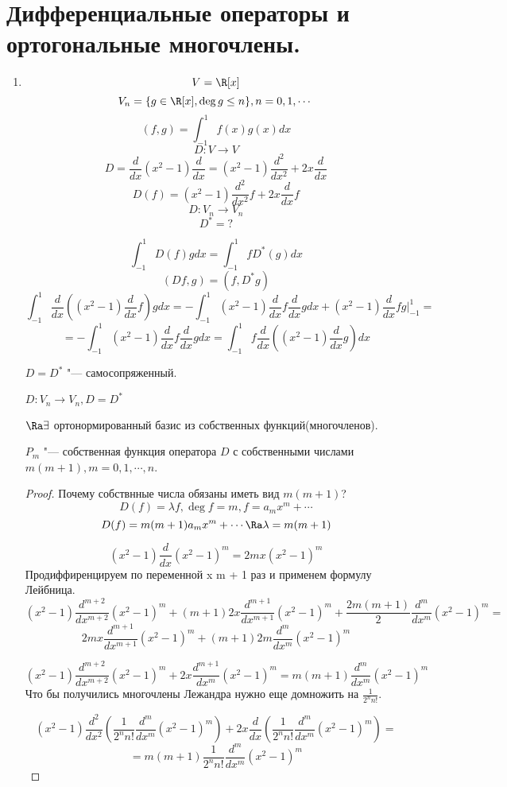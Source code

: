 ﻿\section{Дифференциальные операторы и ортогональные многочлены.}
\begin{enumerate}
\item
$$V = \R[x]$$
$$V_n = \{g \in \R[x], \deg g \le n\}, n = 0, 1, \cdots$$
$$(f, g) = \int_{-1}^{1}f(x)g(x)dx$$
$$D \colon V \to V$$
$$D = \frac{d}{dx}(x^2 - 1)\frac{d}{dx} = (x^2 - 1)\frac{d^2}{dx^2} + 2x\frac{d}{dx}$$
$$D(f) = (x^2 - 1)\frac{d^2}{dx^2}f + 2x\frac{d}{dx}f$$
$$D \colon V_n \to V_n$$
$$D^* = ?$$

$$\int_{-1}^{1}D(f)gdx = \int_{-1}^{1}fD^*(g)dx$$
$$(Df, g) = (f, D^*g)$$
$$\int_{-1}^{1}\frac{d}{dx}((x^2 - 1)\frac{d}{dx}f)gdx = -\int_{-1}^{1}(x^2 - 1)\frac{d}{dx}f\frac{d}{dx}gdx + (x^2 - 1)\frac{d}{dx}fg|_{-1}^{1} =$$
$$= -\int_{-1}^{1}(x^2 - 1)\frac{d}{dx}f\frac{d}{dx}gdx = \int_{-1}^{1}f\frac{d}{dx}((x^2 - 1)\frac{d}{dx}g)dx$$

$D = D^*$ "--- самосопряженный. 

$D \colon V_n \to V_n, D = D^*$

$\Ra \exists$ ортонормированный базис из собственных функций(многочленов).

\begin{theorem}{}
$P_m$ "--- собственная функция оператора $D$ с собственными числами $m(m + 1), m = 0, 1, \cdots, n$.
\end{theorem}
\begin{proof}
    Почему собствнные числа обязаны иметь вид $m(m + 1)$?
    $$D(f) = \lambda f, \deg f = m, f = a_mx^m + \cdots$$
    $$D(f) = m(m + 1)a_mx^m + \cdots \Ra \lambda = m(m + 1)$$

    $$(x^2 - 1)\frac{d}{dx}(x^2 - 1)^m = 2mx(x^2 - 1)^m$$
    Продиффиренцируем по переменной x  m + 1 раз и применем формулу Лейбница.
    $$(x^2 - 1)\frac{d^{m + 2}}{dx^{m + 2}}(x^2 - 1)^m + (m + 1)2x\frac{d^{m + 1}}{dx^{m + 1}}(x^2 - 1)^{m} + \frac{2m(m + 1)}{2}\frac{d^m}{dx^m}(x^2 - 1)^m =$$
    $$2mx\frac{d^{m + 1}}{dx^{m + 1}}(x^2 - 1)^m + (m + 1)2m\frac{d^m}{dx^m}(x^2 - 1)^m$$

    $$(x^2 - 1)\frac{d^{m + 2}}{dx^{m + 2}}(x^2 - 1)^m + 2x\frac{d^{m + 1}}{dx^m}(x^2 - 1)^m = m(m + 1)\frac{d^m}{dx^m}(x^2 - 1)^m$$
    Что бы получились многочлены Лежандра нужно еще домножить на $\frac{1}{2^nn!}$.

    $$(x^2 - 1)\frac{d^2}{dx^2}(\frac{1}{2^nn!}\frac{d^m}{dx^m}(x^2 - 1)^m) + 2x\frac{d}{dx}(\frac{1}{2^nn!}\frac{d^m}{dx^m}(x^2 - 1)^m) =$$
    $$= m(m + 1)\frac{1}{2^nn!}\frac{d^m}{dx^m}(x^2 - 1)^m $$


\end{proof}
\end{enumerate}

